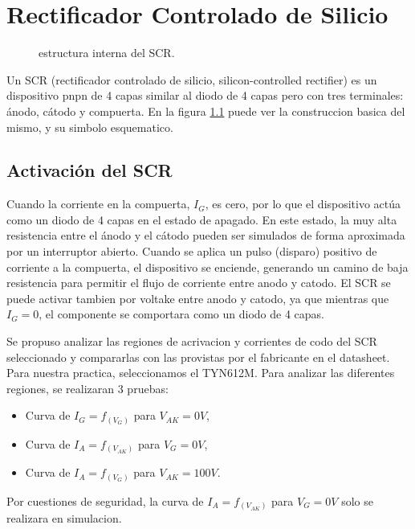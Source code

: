 \chapter{Rectificador Controlado de Silicio}
  \begin{figure}
  \vspace{-1cm}
    \centering
    \resizebox{!}{\linewidth}{
    
    }
    \caption{estructura interna del SCR.}
    \label{fig:scr_si}
  \end{figure}
  Un SCR (rectificador controlado de silicio, silicon-controlled rectifier) es un dispositivo pnpn de 4 capas similar al
  diodo de 4 capas pero con tres terminales: ánodo, cátodo y compuerta. En la figura \ref{fig:scr_si} puede ver la
  construccion basica del mismo, y su simbolo esquematico.

  \section{Activación del SCR}
    Cuando la corriente en la compuerta, $I_G$, es cero, por lo que el dispositivo actúa como un diodo de 4 capas en el
    estado de apagado. En este estado, la muy alta resistencia entre el ánodo y el cátodo pueden ser simulados de forma
    aproximada por un interruptor abierto. Cuando se aplica un pulso (disparo) positivo de corriente a la compuerta, el
    dispositivo se enciende, generando un camino de baja resistencia para permitir el flujo de corriente entre anodo y
    catodo. El SCR se puede activar tambien por voltake entre anodo y catodo, ya que mientras que $I_G = 0$, el componente
    se comportara como un diodo de 4 capas.

    Se propuso analizar las regiones de acrivacion y corrientes de codo del SCR seleccionado y compararlas con las
    provistas por el fabricante en el datasheet. Para nuestra practica, seleccionamos el TYN612M. Para analizar las
    diferentes regiones, se realizaran 3 pruebas:
    \begin{itemize}
      \item Curva de $I_G = f_{(V_G)}$ para $V_{AK} = 0V$,
      \item Curva de $I_A = f_{(V_{AK})}$ para $V_G = 0V$,
      \item Curva de $I_A = f_{(V_G)}$ para $V_{AK} = 100V$.
    \end{itemize}

    Por cuestiones de seguridad, la curva de $I_A = f_{(V_{AK})}$ para $V_G = 0V$ solo se realizara en simulacion.

